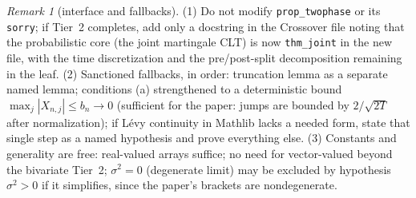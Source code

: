 \documentclass[11pt]{article}
\theoremstyle{plain}
\theoremstyle{remark}
\newtheorem{remark}{Remark}
\begin{document}
\begin{remark}[interface and fallbacks]
(1) Do not modify \texttt{prop\_twophase} or its \texttt{sorry}; if Tier~2
completes, add only a docstring in the Crossover file noting that the
probabilistic core (the joint martingale CLT) is now
\texttt{thm\_joint} in the new file, with the time discretization and the
pre/post-split decomposition remaining in the leaf.
(2) Sanctioned fallbacks, in order: truncation lemma as a separate named
lemma; conditions (a) strengthened to a deterministic bound
$\max_j|X_{n,j}|\le b_n\to0$ (sufficient for the paper: jumps are bounded by
$2/\sqrt{2T}$ after normalization); if L\'evy continuity in Mathlib lacks a
needed form, state that single step as a named hypothesis and prove everything
else.
(3) Constants and generality are free: real-valued arrays suffice; no need for
vector-valued beyond the bivariate Tier~2; $\sigma^2=0$ (degenerate limit) may
be excluded by hypothesis $\sigma^2>0$ if it simplifies, since the paper's
brackets are nondegenerate.
\end{remark}
\end{document}
